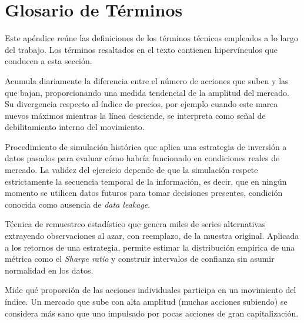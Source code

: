
\section{Glosario de T\'erminos}
\label{app:glossary}

Este ap\'endice re\'une las definiciones de los t\'erminos t\'ecnicos empleados a lo largo del trabajo. Los t\'erminos resaltados en el texto contienen hiperv\'inculos que conducen a esta secci\'on.

\begin{description}[style=nextline, leftmargin=1.5cm]

\item[\hypertarget{glos:advance_decline}{\textit{Advance-Decline Line}}]
Acumula diariamente la diferencia entre el n\'umero de acciones que suben y las que bajan, proporcionando una medida tendencial de la amplitud del mercado. Su divergencia respecto al \'indice de precios, por ejemplo cuando este marca nuevos m\'aximos mientras la l\'inea desciende, se interpreta como se\~nal de debilitamiento interno del movimiento.

\item[\hypertarget{glos:backtesting}{\textit{Backtesting}}]
Procedimiento de simulaci\'on hist\'orica que aplica una estrategia de inversi\'on a datos pasados para evaluar c\'omo habr\'ia funcionado en condiciones reales de mercado. La validez del ejercicio depende de que la simulaci\'on respete estrictamente la secuencia temporal de la informaci\'on, es decir, que en ning\'un momento se utilicen datos futuros para tomar decisiones presentes, condici\'on conocida como ausencia de \textit{data leakage}.

\item[\hypertarget{glos:bootstrap}{\textit{Bootstrap}}]
T\'ecnica de remuestreo estad\'istico que genera miles de series alternativas extrayendo observaciones al azar, con reemplazo, de la muestra original. Aplicada a los retornos de una estrategia, permite estimar la distribuci\'on emp\'irica de una m\'etrica como el \textit{Sharpe ratio} y construir intervalos de confianza sin asumir normalidad en los datos.

\item[\hypertarget{glos:breadth}{\textit{Breadth} (amplitud de mercado)}]
Mide qu\'e proporci\'on de las acciones individuales participa en un movimiento del \'indice. Un mercado que sube con alta amplitud (muchas acciones subiendo) se considera m\'as sano que uno impulsado por pocas acciones de gran capitalizaci\'on.


\end{description}

